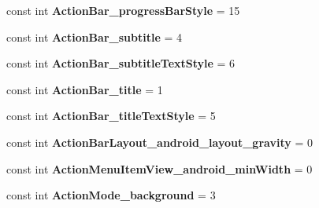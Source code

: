 \begin{DoxyCompactItemize}
\item 
\hypertarget{classClient_1_1Droid_1_1Resource_1_1Styleable_abdba196720a1f3c4be217d0272e900f0}{}const int {\bfseries Action\+Bar\+\_\+progress\+Bar\+Style} = 15\label{classClient_1_1Droid_1_1Resource_1_1Styleable_abdba196720a1f3c4be217d0272e900f0}

\item 
\hypertarget{classClient_1_1Droid_1_1Resource_1_1Styleable_ab3216a7cf84b41bdcc4438c36ad67fcd}{}const int {\bfseries Action\+Bar\+\_\+subtitle} = 4\label{classClient_1_1Droid_1_1Resource_1_1Styleable_ab3216a7cf84b41bdcc4438c36ad67fcd}

\item 
\hypertarget{classClient_1_1Droid_1_1Resource_1_1Styleable_aca779dda06e3d4b49e61aa3bee89a9c3}{}const int {\bfseries Action\+Bar\+\_\+subtitle\+Text\+Style} = 6\label{classClient_1_1Droid_1_1Resource_1_1Styleable_aca779dda06e3d4b49e61aa3bee89a9c3}

\item 
\hypertarget{classClient_1_1Droid_1_1Resource_1_1Styleable_aa4f804b2dc9853627360b5902cc8da3f}{}const int {\bfseries Action\+Bar\+\_\+title} = 1\label{classClient_1_1Droid_1_1Resource_1_1Styleable_aa4f804b2dc9853627360b5902cc8da3f}

\item 
\hypertarget{classClient_1_1Droid_1_1Resource_1_1Styleable_a83c2a683d039d2aa2751e7d6d04b78af}{}const int {\bfseries Action\+Bar\+\_\+title\+Text\+Style} = 5\label{classClient_1_1Droid_1_1Resource_1_1Styleable_a83c2a683d039d2aa2751e7d6d04b78af}

\item 
\hypertarget{classClient_1_1Droid_1_1Resource_1_1Styleable_acfd929aafdce18ce28d1229674b96a1d}{}const int {\bfseries Action\+Bar\+Layout\+\_\+android\+\_\+layout\+\_\+gravity} = 0\label{classClient_1_1Droid_1_1Resource_1_1Styleable_acfd929aafdce18ce28d1229674b96a1d}

\item 
\hypertarget{classClient_1_1Droid_1_1Resource_1_1Styleable_a3388be21c87df16081a7dc9feccaeb5c}{}const int {\bfseries Action\+Menu\+Item\+View\+\_\+android\+\_\+min\+Width} = 0\label{classClient_1_1Droid_1_1Resource_1_1Styleable_a3388be21c87df16081a7dc9feccaeb5c}

\item 
\hypertarget{classClient_1_1Droid_1_1Resource_1_1Styleable_a59206ad30df4111b554ef29cd6813785}{}const int {\bfseries Action\+Mode\+\_\+background} = 3\label{classClient_1_1Droid_1_1Resource_1_1Styleable_a59206ad30df4111b554ef29cd6813785}


\end{DoxyCompactItemize}
